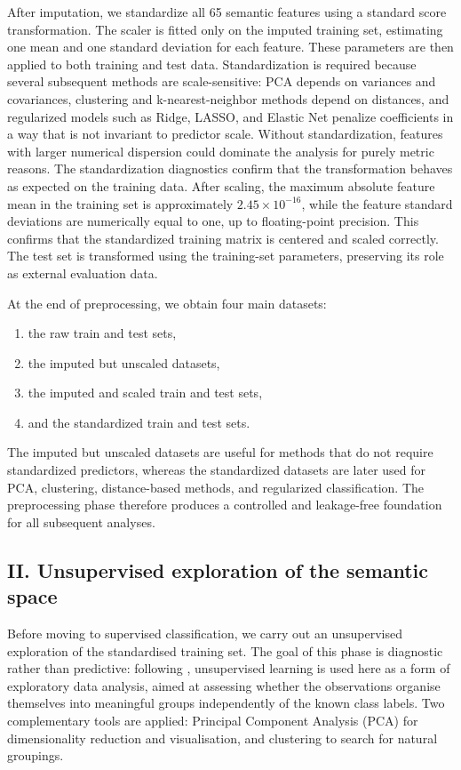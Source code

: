\documentclass{ipgpmaster}
\begin{document}
After imputation, we standardize all 65 semantic features using a standard score transformation. The scaler is fitted only on the imputed training set, estimating one mean and one standard deviation for each feature. These parameters are then applied to both training and test data. Standardization is required because several subsequent methods are scale-sensitive: PCA depends on variances and covariances, clustering and k-nearest-neighbor methods depend on distances, and regularized models such as Ridge, LASSO, and Elastic Net penalize coefficients in a way that is not invariant to predictor scale. Without standardization, features with larger numerical dispersion could dominate the analysis for purely metric reasons.
The standardization diagnostics confirm that the transformation behaves as expected on the training data. After scaling, the maximum absolute feature mean in the training set is approximately \(2.45 \times 10^{-16}\), while the feature standard deviations are numerically equal to one, up to floating-point precision. This confirms that the standardized training matrix is centered and scaled correctly. The test set is transformed using the training-set parameters, preserving its role as external evaluation data.

At the end of preprocessing, we obtain four main datasets: \begin{enumerate}
    \item the raw train and test sets,
    \item the imputed but unscaled datasets,
    \item the imputed and scaled train and test sets,
    \item and the standardized train and test sets.
\end{enumerate}
The imputed but unscaled datasets are useful for methods that do not require standardized predictors, whereas the standardized datasets are later used for PCA, clustering, distance-based methods, and regularized classification. The preprocessing phase therefore produces a controlled and leakage-free foundation for all subsequent analyses.

\subsection{II. Unsupervised exploration of the semantic space}
\label{subsec:unsupervised}

Before moving to supervised classification, we carry out an unsupervised
exploration of the standardised training set.
The goal of this phase is diagnostic rather than predictive: following
\cite{james2013isl}, unsupervised learning is used here as a form of
exploratory data analysis, aimed at assessing whether the observations
organise themselves into meaningful groups independently of the known
class labels\cite{james2013isl}.
Two complementary tools are applied: Principal Component Analysis (PCA)
for dimensionality reduction and visualisation, and clustering to search
for natural groupings.
\end{document}
